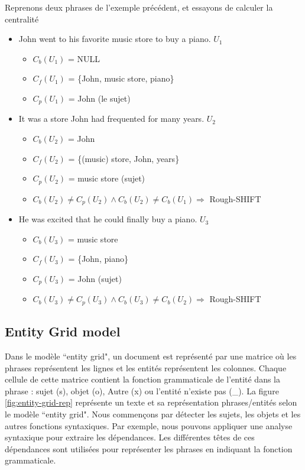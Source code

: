 \documentclass{KodeBook}
\begin{document}
Reprenons deux phrases de l'exemple précédent, et essayons de calculer la centralité
\begin{itemize}
	\item John went to his favorite music store to buy a piano. $U_1$
	\begin{itemize}
		\item $C_b(U_1)$ = NULL
		\item $C_f(U_1)$ = \{John, music store, piano\}
		\item $C_p(U_1)$ = John (le sujet)
	\end{itemize}
	\item It was a store John had frequented for many years. $U_2$
	\begin{itemize}
		\item $C_b(U_2)$ = John
		\item $C_f(U_2)$ = \{(music) store, John, years\}
		\item $C_p(U_2)$ =  music store (sujet)
		\item $C_b(U_2) \ne C_p(U_2) \wedge C_b(U_2) \ne C_b(U_1) \Rightarrow$ Rough-SHIFT
	\end{itemize}
	\item He was excited that he could finally buy a piano. $U_3$
	\begin{itemize}
		\item $C_b(U_3)$ = music store
		\item $C_f(U_3)$ = \{John, piano\}
		\item $C_p(U_3)$ =  John (sujet)
		\item $C_b(U_3) \ne C_p(U_3) \wedge C_b(U_3) \ne C_b(U_2) \Rightarrow$ Rough-SHIFT
	\end{itemize}
\end{itemize}


\subsection{Entity Grid model}

Dans le modèle ``entity grid", un document est représenté par une matrice où les phrases représentent les lignes et les entités représentent les colonnes. 
Chaque cellule de cette matrice contient la fonction grammaticale de l'entité dans la phrase : sujet (s), objet (o), Autre (x) ou l'entité n'existe pas (\_). 
La figure \ref{fig:entity-grid-rep} représente un texte et sa représentation phrases/entités selon le modèle ``entity grid". 
Nous commençons par détecter les sujets, les objets et les autres fonctions syntaxiques.
Par exemple, nous pouvons appliquer une analyse syntaxique pour extraire les dépendances.
Les différentes têtes de ces dépendances sont utilisées pour représenter les phrases en indiquant la fonction grammaticale.
\end{document}
